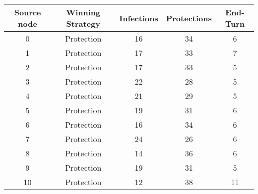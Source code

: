 \documentclass[results.tex]{subfiles}
\begin{document}
    \begin{center}
        \begin{tabular}{| c || c | c | c | c |}
            \hline
            {\bfseries Source node} & {\bfseries Winning Strategy} & {\bfseries Infections} & {\bfseries Protections}
            & {\bfseries End-Turn}
            \\  %
            \hline\hline
            0                       & Protection                   & 16                     & 34                      & 6                    \\
            \hline
            1                       & Protection                   & 17                     & 33                      & 7                    \\
            \hline
            2                       & Protection                   & 17                     & 33                      & 5                    \\
            \hline
            3                       & Protection                   & 22                     & 28                      & 5                    \\
            \hline
            4                       & Protection                   & 21                     & 29                      & 5                    \\
            \hline
            5                       & Protection                   & 19                     & 31                      & 6                    \\
            \hline
            6                       & Protection                   & 16                     & 34                      & 6                    \\
            \hline
            7                       & Protection                   & 24                     & 26                      & 6                    \\
            \hline
            8                       & Protection                   & 14                     & 36                      & 6                    \\
            \hline
            9                       & Protection                   & 19                     & 31                      & 5                    \\
            \hline
            10                      & Protection                   & 12                     & 38                      & 11                   \\

\end{tabular}
\end{center}
\end{document}

